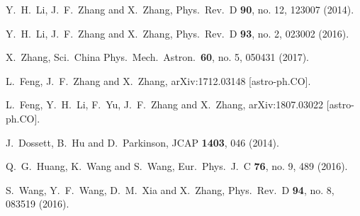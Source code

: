 \documentclass[aps,prd,nofootinbib,amsmath,amssymb,twocolumn,superscriptaddress,10pt]{revtex4}%
\begin{document}
\begin{thebibliography}{}
  Y.~H.~Li, J.~F.~Zhang and X.~Zhang,
  Phys.\ Rev.\ D {\bf 90}, no. 12, 123007 (2014).

  Y.~H.~Li, J.~F.~Zhang and X.~Zhang,
  Phys.\ Rev.\ D {\bf 93}, no. 2, 023002 (2016).

  X.~Zhang,
  Sci.\ China Phys.\ Mech.\ Astron.\  {\bf 60}, no. 5, 050431 (2017).

  L.~Feng, J.~F.~Zhang and X.~Zhang,
  arXiv:1712.03148 [astro-ph.CO].

  L.~Feng, Y.~H.~Li, F.~Yu, J.~F.~Zhang and X.~Zhang,
  arXiv:1807.03022 [astro-ph.CO].


  J.~Dossett, B.~Hu and D.~Parkinson,
  JCAP {\bf 1403}, 046 (2014).

  Q.~G.~Huang, K.~Wang and S.~Wang,
  Eur.\ Phys.\ J.\ C {\bf 76}, no. 9, 489 (2016).

  S.~Wang, Y.~F.~Wang, D.~M.~Xia and X.~Zhang,
  Phys.\ Rev.\ D {\bf 94}, no. 8, 083519 (2016).



\end{thebibliography}
\end{document}
